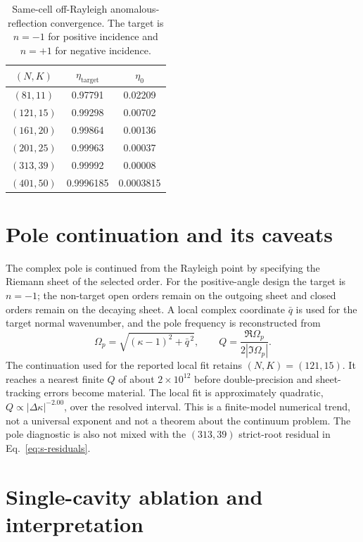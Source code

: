 \documentclass[aps,prl,reprint,superscriptaddress,nofootinbib,floatfix]{revtex4-2}
\begin{document}
\begin{table}[t]
\caption{\label{tab:s-off-rayleigh}Same-cell off-Rayleigh anomalous-reflection convergence.  The target is $n=-1$ for positive incidence and $n=+1$ for negative incidence.}
\begin{ruledtabular}
\begin{tabular}{ccc}
$(N,K)$ & $\eta_{\mathrm{target}}$ & $\eta_0$\\
\hline
$(81,11)$ & 0.97791 & 0.02209\\
$(121,15)$ & 0.99298 & 0.00702\\
$(161,20)$ & 0.99864 & 0.00136\\
$(201,25)$ & 0.99963 & 0.00037\\
$(313,39)$ & 0.99992 & 0.00008\\
$(401,50)$ & 0.9996185 & 0.0003815\\
\end{tabular}
\end{ruledtabular}
\end{table}

\section{Pole continuation and its caveats}
\label{sec:s-pole}

The complex pole is continued from the Rayleigh point by specifying the
Riemann sheet of the selected order.  For the positive-angle design the target
is $n=-1$; the non-target open orders remain on the outgoing sheet and closed
orders remain on the decaying sheet.  A local complex coordinate $\bar q$ is
used for the target normal wavenumber, and the pole frequency is reconstructed
from
\begin{equation}
 \Omega_p=\sqrt{(\kappa-1)^2+\bar q^{\,2}},
 \qquad
 Q=\frac{\Re\Omega_p}{2|\Im\Omega_p|} .
 \label{eq:s-pole-q}
\end{equation}
The continuation used for the reported local fit retains $(N,K)=(121,15)$.
It reaches a nearest finite $Q$ of about $2\times10^{12}$ before
double-precision and sheet-tracking errors become material.  The local fit
is approximately quadratic, $Q\propto|\Delta\kappa|^{-2.00}$, over the resolved interval.  This is a
finite-model numerical trend, not a universal exponent and not a theorem
about the continuum problem.  The pole diagnostic is also not mixed with the
$(313,39)$ strict-root residual in Eq.~\eqref{eq:s-residuals}.

\section{Single-cavity ablation and interpretation}
\label{sec:s-ablation}
\end{document}
